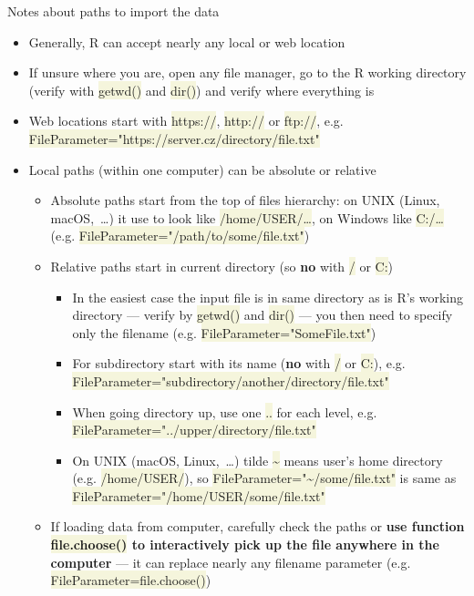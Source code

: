 \documentclass[compress, ucs, xelatex, 11pt, xcolor=svgnames, aspectratio=169,
	hyperref={
		bookmarks=true,
		unicode=true,
		colorlinks=true,
		pdftitle={Molecular data in R},
		plainpages=false,
		pdfauthor={Vojtech Zeisek},
		pdfsubject={Course about phylogeny and evolution in R},
		pdfcreator={XeLaTeX},
		pdfkeywords={R, evolution, phylogeny, molecular data},
		linkcolor=Crimson, %
		anchorcolor=Magenta, %
		citecolor=Magenta, %
		filecolor=Magenta, %
		menucolor=Magenta, %
		urlcolor=DodgerBlue, %
		pdftex},
	url={hyphens, lowtilde} %
	]{beamer}
\renewcommand{\texttt}[1]{\colorbox{Beige}{{\ttfamily #1}}}
\begin{document}
\begin{frame}[allowframebreaks]{Notes about paths to import the data}
	\label{path}
	\begin{itemize}
		\item Generally, R can accept nearly any local or web location
		\item If unsure where you are, open any file manager, go to the R working directory (verify with \texttt{getwd()} and \texttt{dir()}) and verify where everything is
		\item Web locations start with \texttt{https://}, \texttt{http://} or \texttt{ftp://}, e.g. \texttt{FileParameter="https://server.cz/directory/file.txt"}
		\item Local paths (within one computer) can be absolute or relative
		\begin{itemize}
			\item Absolute paths start from the top of files hierarchy: on UNIX (Linux, macOS,~\ldots) it use to look like \texttt{/home/USER/\ldots}, on Windows like \texttt{C:/\ldots} (e.g. \texttt{FileParameter="/path/to/some/file.txt"})
			\item Relative paths start in current directory (so \textbf{no} with \texttt{/} or \texttt{C:})
			\begin{itemize}
	\item In the easiest case the input file is in same directory as is R's working directory --- verify by \texttt{getwd()} and \texttt{dir()} --- you then need to specify only the filename (e.g. \texttt{FileParameter="SomeFile.txt"})
	\item For subdirectory start with its name (\textbf{no} with \texttt{/} or \texttt{C:}), e.g. \texttt{FileParameter="subdirectory/another/directory/file.txt"}
	\item When going directory up, use one \texttt{..} for each level, e.g. \texttt{FileParameter="../upper/directory/file.txt"}
	\item On UNIX (macOS, Linux,~\ldots) tilde \texttt{\textasciitilde} means user's home directory (e.g. \texttt{/home/USER/}), so \texttt{FileParameter="\textasciitilde/some/file.txt"} is same as \texttt{FileParameter="/home/USER/some/file.txt"}
			\end{itemize}
			\item If loading data from computer, carefully check the paths or \textbf{use function \texttt{file.choose()} to interactively pick up the file anywhere in the computer} --- it can replace nearly any filename parameter (e.g. \alert{\texttt{FileParameter=file.choose()}})

\end{itemize}
\end{itemize}
\end{frame}
\end{document}
